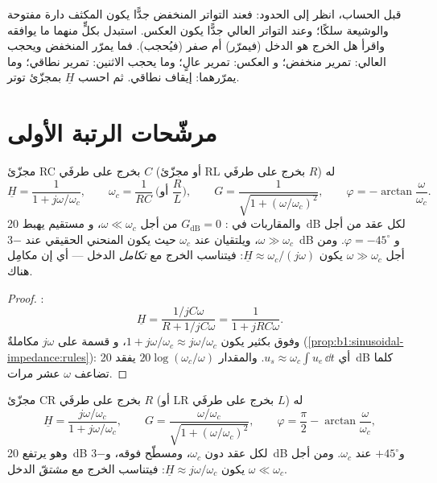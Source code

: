 \begin{method}\label{met:b1:filters-transfer-functions:nature}
قبل الحساب، انظر إلى الحدود: فعند التواتر المنخفض جدًّا يكون المكثف
دارة مفتوحة والوشيعة سلكًا؛ وعند التواتر العالي جدًّا يكون
العكس. استبدل بكلٍّ منهما ما يوافقه واقرأ هل الخرج هو الدخل
(فيمرّر) أم صفر (فيُحجب). فما يمرّر المنخفض ويحجب العالي: تمرير منخفض؛ و
العكس: تمرير عالٍ؛ وما يحجب الاثنين: تمرير نطاقي؛ وما يمرّرهما: إيقاف نطاقي.
ثم احسب $\underline H$ بمجزّئ توتر.
\end{method}

\section{مرشّحات الرتبة الأولى}

\begin{proposition}\label{prop:b1:filters-transfer-functions:lowpass1}
مجزّئ RC بخرج على طرفَي $C$ (أو مجزّئ RL بخرج
على طرفَي $R$) له
\[
\underline H = \frac{1}{1 + j\omega/\omega_c}, \qquad
\omega_c = \frac{1}{RC} \ \Big(\text{أو } \frac{R}{L}\Big),
\qquad G = \frac{1}{\sqrt{1 + (\omega/\omega_c)^2}}, \qquad
\varphi = -\arctan\frac{\omega}{\omega_c} .
\]
والمقاربات في : $G_{\mathrm{dB}} = 0$ من أجل $\omega \ll \omega_c$، و
مستقيم يهبط \qty{20}{dB} لكل عقد من أجل $\omega \gg \omega_c$،
ويلتقيان عند $\omega_c$ حيث يكون المنحني الحقيقي عند \qty{-3}{dB} و
$\varphi = -45^\circ$. ومن أجل $\omega \gg \omega_c$ يكون $\underline H \approx
\omega_c/(j\omega)$: فيتناسب الخرج مع \emph{تكامل}
الدخل --- أي إن  مكامِل هناك.
\end{proposition}

\begin{proof}
:
\[
\underline H = \frac{1/jC\omega}{R + 1/jC\omega} = \frac{1}{1 + jRC\omega} .
\]
وفوق  بكثير يكون $1 + j\omega/\omega_c \approx j\omega/\omega_c$، و
قسمة  على $j\omega$ مكاملةٌ
(\cref{prop:b1:sinusoidal-impedance:rules}): أي $u_s \approx \omega_c\int u_e\,\dd t$.
والمقدار $20\log(\omega_c/\omega)$ يفقد \qty{20}{dB} كلما تضاعف $\omega$ عشر مرات.
\end{proof}

\begin{proposition}\label{prop:b1:filters-transfer-functions:highpass1}
مجزّئ CR بخرج على طرفَي $R$ (أو LR بخرج على طرفَي $L$)
له
\[
\underline H = \frac{j\omega/\omega_c}{1 + j\omega/\omega_c},
\qquad G = \frac{\omega/\omega_c}{\sqrt{1 + (\omega/\omega_c)^2}},
\qquad \varphi = \frac{\pi}{2} - \arctan\frac{\omega}{\omega_c},
\]
وهو يرتفع \qty{20}{dB} لكل عقد دون $\omega_c$، ومسطّح فوقه، و\qty{-3}{dB}
و$+45^\circ$ عند $\omega_c$. ومن أجل $\omega \ll \omega_c$ يكون $\underline H
\approx j\omega/\omega_c$: فيتناسب الخرج مع
\emph{مشتقّ} الدخل.
\end{proposition}

